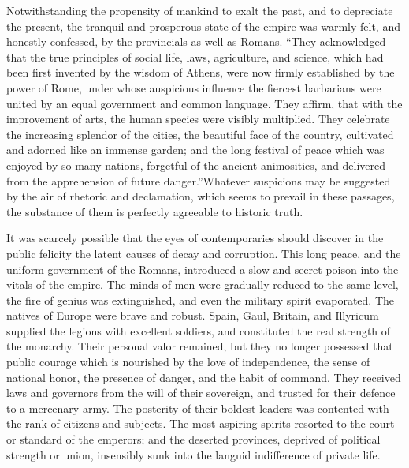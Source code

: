 Notwithstanding the propensity of mankind to exalt the past, and
to depreciate the present, the tranquil and prosperous state of
the empire was warmly felt, and honestly confessed, by the
provincials as well as Romans. “They acknowledged that the true
principles of social life, laws, agriculture, and science, which
had been first invented by the wisdom of Athens, were now firmly
established by the power of Rome, under whose auspicious
influence the fiercest barbarians were united by an equal
government and common language. They affirm, that with the
improvement of arts, the human species were visibly multiplied.
They celebrate the increasing splendor of the cities, the
beautiful face of the country, cultivated and adorned like an
immense garden; and the long festival of peace which was enjoyed
by so many nations, forgetful of the ancient animosities, and
delivered from the apprehension of future danger.”\footnotemark[109] Whatever
suspicions may be suggested by the air of rhetoric and
declamation, which seems to prevail in these passages, the
substance of them is perfectly agreeable to historic truth.


It was scarcely possible that the eyes of contemporaries should
discover in the public felicity the latent causes of decay and
corruption. This long peace, and the uniform government of the
Romans, introduced a slow and secret poison into the vitals of
the empire. The minds of men were gradually reduced to the same
level, the fire of genius was extinguished, and even the military
spirit evaporated. The natives of Europe were brave and robust.
Spain, Gaul, Britain, and Illyricum supplied the legions with
excellent soldiers, and constituted the real strength of the
monarchy. Their personal valor remained, but they no longer
possessed that public courage which is nourished by the love of
independence, the sense of national honor, the presence of
danger, and the habit of command. They received laws and
governors from the will of their sovereign, and trusted for their
defence to a mercenary army. The posterity of their boldest
leaders was contented with the rank of citizens and subjects. The
most aspiring spirits resorted to the court or standard of the
emperors; and the deserted provinces, deprived of political
strength or union, insensibly sunk into the languid indifference
of private life.

